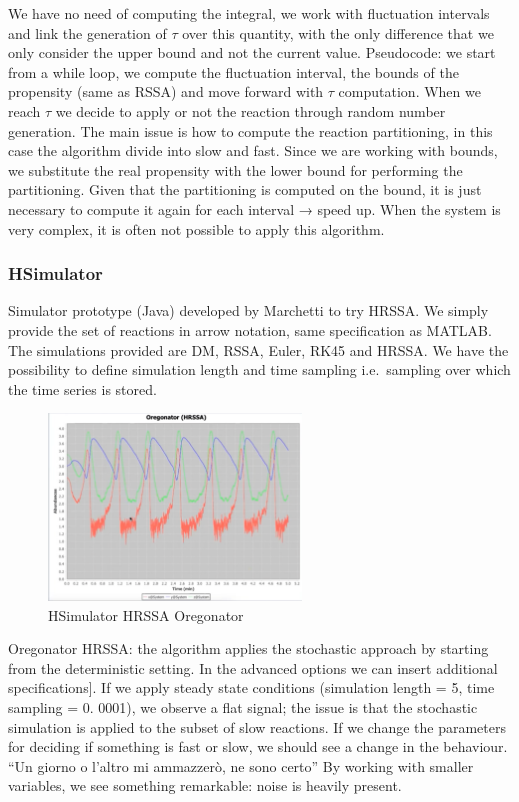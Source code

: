 We have no need of computing the integral, we work with fluctuation intervals and link the generation of $\tau$ over this quantity, with the only difference that we only consider the upper bound and not the current value.
Pseudocode: we start from a while loop, we compute the fluctuation interval, the bounds of the propensity (same as RSSA) and move forward with $\tau$ computation.
When we reach $\tau$ we decide to apply or not the reaction through random number generation.
The main issue is how to compute the reaction partitioning, in this case the algorithm divide into slow and fast.
Since we are working with bounds, we substitute the real propensity with the lower bound for performing the partitioning.
Given that the partitioning is computed on the bound, it is just necessary to compute it again for each interval → speed up.
When the system is very complex, it is often not possible to apply this algorithm.

\subsubsection{HSimulator}
Simulator prototype (Java) developed by Marchetti to try HRSSA.
We simply provide the set of reactions in arrow notation, same specification as MATLAB.
The simulations provided are DM, RSSA, Euler, RK45 and HRSSA.
We have the possibility to define simulation length and time sampling i.e.~sampling over which the time series is stored.

\begin{figure}
  \centering
  \includegraphics[width=0.6\textwidth]{HRSSA_oregonator.png}
  \caption{HSimulator HRSSA Oregonator}
\end{figure}

Oregonator HRSSA: the algorithm applies the stochastic approach by starting from the deterministic setting.
In the advanced options we can insert additional specifications{]}.
If we apply steady state conditions (simulation length = 5, time sampling = 0.
0001), we observe a flat signal; the issue is that the stochastic simulation is applied to the subset of slow reactions.
If we change the parameters for deciding if something is fast or slow, we should see a change in the behaviour.
``Un giorno o l'altro mi ammazzerò, ne sono certo'' By working with smaller variables, we see something remarkable: noise is heavily present.
